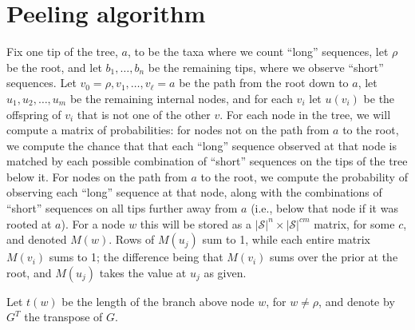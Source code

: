 \documentclass{article}
\newcommand{\calS}{\mathcal{S}}  %
\theoremstyle{plain}
\theoremstyle{definition}
\begin{document}
\section{Peeling algorithm}
\label{ss:peeling_algorithm}

Fix one tip of the tree, $a$, to be the taxa where we count ``long'' sequences, let $\rho$ be the root, and let $b_1, \ldots, b_n$ be the remaining tips,
where we observe ``short'' sequences.
Let $v_0=\rho, v_1, \ldots, v_\ell = a$ be the path from the root down to $a$,
let $u_1, u_2, \ldots, u_m$ be the remaining internal nodes,
and for each $v_i$ let $u(v_i)$ be the offspring of $v_i$ that is not one of the other $v$.
For each node in the tree,
we will compute a matrix of probabilities:
for nodes not on the path from $a$ to the root,
we compute the chance that that each ``long'' sequence observed at that node
is matched by each possible combination of ``short'' sequences on the tips of the tree below it.
For nodes on the path from $a$ to the root, we compute the probability of observing
each ``long'' sequence at that node, along with the combinations of ``short'' sequences
on all tips further away from $a$ (i.e., below that node if it was rooted at $a$).
For a node $w$ this will be stored as a $|\calS|^{n} \times |\calS|^{cm}$ matrix, for some $c$,
and denoted $M(w)$.
Rows of $M(u_j)$ sum to 1,
while each entire matrix $M(v_i)$ sums to 1;
the difference being that $M(v_i)$ sums over the prior at the root,
and $M(u_j)$ takes the value at $u_j$ as given.

Let $t(w)$ be the length of the branch above node $w$, for $w \neq \rho$,
and denote by $G^T$ the transpose of $G$.
\end{document}
